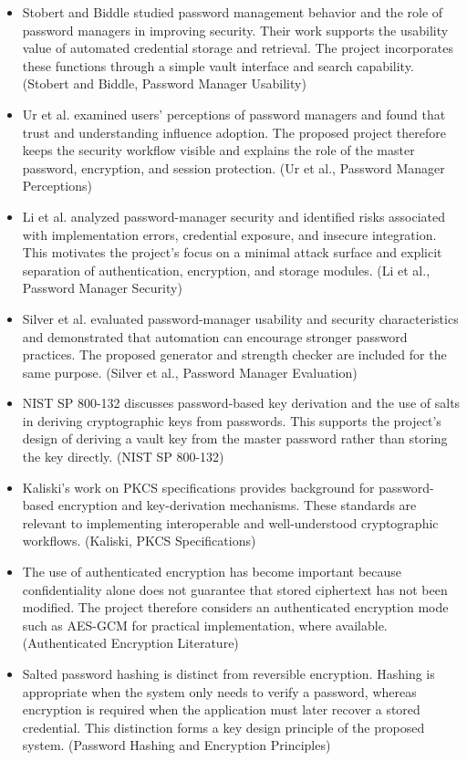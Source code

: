 \documentclass[12pt,a4paper,oneside]{report}
\begin{document}
\begin{itemize}
\item Stobert and Biddle studied password management behavior and the role of password managers in improving security. Their work supports the usability value of automated credential storage and retrieval. The project incorporates these functions through a simple vault interface and search capability. (Stobert and Biddle, Password Manager Usability)
\item Ur et al. examined users’ perceptions of password managers and found that trust and understanding influence adoption. The proposed project therefore keeps the security workflow visible and explains the role of the master password, encryption, and session protection. (Ur et al., Password Manager Perceptions)
\item Li et al. analyzed password-manager security and identified risks associated with implementation errors, credential exposure, and insecure integration. This motivates the project’s focus on a minimal attack surface and explicit separation of authentication, encryption, and storage modules. (Li et al., Password Manager Security)
\item Silver et al. evaluated password-manager usability and security characteristics and demonstrated that automation can encourage stronger password practices. The proposed generator and strength checker are included for the same purpose. (Silver et al., Password Manager Evaluation)
\item NIST SP 800-132 discusses password-based key derivation and the use of salts in deriving cryptographic keys from passwords. This supports the project’s design of deriving a vault key from the master password rather than storing the key directly. (NIST SP 800-132)
\item Kaliski’s work on PKCS specifications provides background for password-based encryption and key-derivation mechanisms. These standards are relevant to implementing interoperable and well-understood cryptographic workflows. (Kaliski, PKCS Specifications)
\item The use of authenticated encryption has become important because confidentiality alone does not guarantee that stored ciphertext has not been modified. The project therefore considers an authenticated encryption mode such as AES-GCM for practical implementation, where available. (Authenticated Encryption Literature)
\item Salted password hashing is distinct from reversible encryption. Hashing is appropriate when the system only needs to verify a password, whereas encryption is required when the application must later recover a stored credential. This distinction forms a key design principle of the proposed system. (Password Hashing and Encryption Principles)

\end{itemize}
\end{document}
